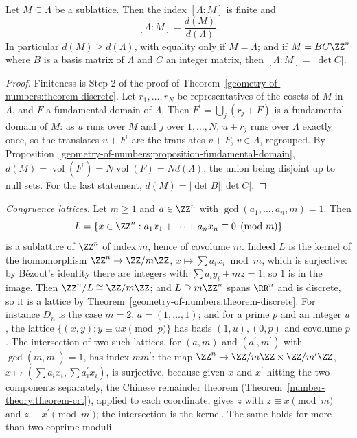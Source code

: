 \begin{proposition}\label{geometry-of-numbers:proposition-index}
Let $M \subseteq \Lambda$ be a sublattice. Then the index $[\Lambda : M]$ is finite and
\[
[\Lambda : M] = \frac{d(M)}{d(\Lambda)}.
\]
In particular $d(M) \geq d(\Lambda)$, with equality only if $M = \Lambda$; and if $M = BC\ZZ^n$ where $B$ is a basis matrix of $\Lambda$ and $C$ an integer matrix, then $[\Lambda : M] = |\det C|$.
\end{proposition}

\begin{proof}
Finiteness is Step 2 of the proof of Theorem~\ref{geometry-of-numbers:theorem-discrete}. Let $r_1, \ldots, r_N$ be representatives of the cosets of $M$ in $\Lambda$, and $F$ a fundamental
domain of $\Lambda$. Then $F^{\prime} = \bigcup_j(r_j + F)$ is a fundamental domain of $M$: as $u$ runs over $M$ and $j$ over $1, \ldots, N$, $u + r_j$ runs over $\Lambda$ exactly once, so the
translates $u + F^{\prime}$ are the translates $v + F$, $v \in \Lambda$, regrouped. By Proposition~\ref{geometry-of-numbers:proposition-fundamental-domain},
$d(M) = \operatorname{vol}(F^{\prime}) = N\operatorname{vol}(F) = Nd(\Lambda)$, the union being disjoint up to null sets. For the last statement, $d(M) = |\det B||\det C|$.
\end{proof}

\begin{example}\label{geometry-of-numbers:example-congruence-lattice}
\emph{Congruence lattices.} Let $m \geq 1$ and $a \in \ZZ^n$ with $\gcd(a_1, \ldots, a_n, m) = 1$. Then
\[
L = \{x \in \ZZ^n : a_1x_1 + \cdots + a_nx_n \equiv 0 \pmod m\}
\]
is a sublattice of $\ZZ^n$ of index $m$, hence of covolume $m$. Indeed $L$ is the kernel of the homomorphism $\ZZ^n \to \ZZ/m\ZZ$, $x \mapsto \sum a_ix_i \bmod m$, which is surjective: by B\'ezout's
identity there are integers with $\sum a_iy_i + mz = 1$, so $1$ is in the image. Then $\ZZ^n/L \cong \ZZ/m\ZZ$; and $L \supseteq m\ZZ^n$ spans $\RR^n$ and is discrete, so it is a lattice by
Theorem~\ref{geometry-of-numbers:theorem-discrete}. For instance $D_n$ is the case $m = 2$, $a = (1, \ldots, 1)$; and for a prime $p$ and an integer $u$, the lattice
$\{(x, y) : y \equiv ux \pmod p\}$ has basis $(1, u), (0, p)$ and covolume $p$. The intersection of two such lattices, for $(a, m)$ and $(a^{\prime}, m^{\prime})$ with $\gcd(m, m^{\prime}) = 1$, has index $mm^{\prime}$: the map
$\ZZ^n \to \ZZ/m\ZZ \times \ZZ/m^{\prime}\ZZ$, $x \mapsto (\sum a_ix_i, \sum a_i^{\prime}x_i)$, is surjective, because given $x$ and $x^{\prime}$ hitting the two components separately, the Chinese
remainder theorem (Theorem~\ref{number-theory:theorem-crt}), applied to each coordinate, gives $z$ with $z \equiv x \pmod m$ and $z \equiv x^{\prime} \pmod{m^{\prime}}$; the intersection is
the kernel. The same holds for more than two coprime moduli.
\end{example}

